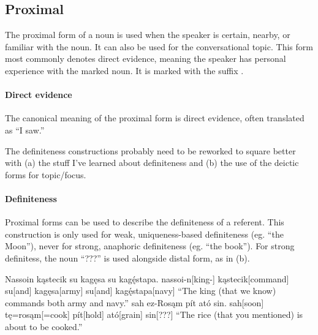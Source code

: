 \subsection{Proximal}
The proximal form of a noun is used when the speaker is certain, nearby, or familiar with the noun. It can also be used for the conversational topic. This form most commonly denotes direct evidence, meaning the speaker has personal experience with the marked noun. It is marked with the suffix . 


\paragraph{Direct evidence}
The canonical meaning of the proximal form is direct evidence, often translated as “I saw.” 

\begin{kaobox}[frametitle=\sc todo:]
    The definiteness constructions probably need to be reworked to square better with (a) the stuff I've learned about definiteness and (b) the use of the deictic forms for topic/focus.
\end{kaobox}

\paragraph{Definiteness}
Proximal forms can be used to describe the definiteness of a referent. This construction is only used for weak, uniqueness-based definiteness (eg. “the Moon”), never for strong, anaphoric definiteness (eg. “the book”). For strong definitess, the noun  “???” is used alongside distal form, as in (\nextx b).

\begin{gloss*}
\a \begingl
\glpreamble Nassoin kąstecik su kagęsa su kagę́stapa. \endpreamble
nassoi-n[king-]
kąstecik[command]
su[and]
kagęsa[army]
su[and]
kagę́stapa[navy]
\glft “The king (that we know) commands both army and navy.”
\endgl
\a \begingl
\glpreamble sah ez-Rosąm pít ató sin. \endpreamble
sah[soon]
tę=rosąm[=cook]
pít[hold\gbs{}]
ató[grain\gbs{}]
sin[???]
\glft “The rice (that you mentioned) is about to be cooked.”
\endgl
\end{gloss*}

